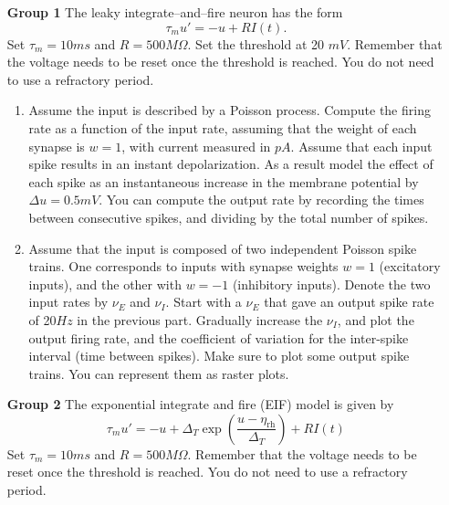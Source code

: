 \documentclass[12pt]{article}
\begin{document}
\begin{enumerate}
\item[\bf Group 1]  The leaky integrate--and--fire neuron has the form
$$
\tau_m u' = - u + R I(t).
$$
Set $\tau_m = 10 ms$ and $R = 500M \Omega$.  Set the threshold at 20 $mV$. Remember that the voltage needs to be reset once the threshold is reached.  You do not need to use a refractory period.   

\begin{enumerate}
\item Assume the input is described by a Poisson process. Compute the firing rate as a function of the input rate, assuming that the weight of each synapse is $w = 1$,
with current measured in $pA$.  Assume that each input spike results in an instant depolarization.  As a result model the effect of each spike as  an instantaneous increase in the membrane potential
by $\Delta u = 0.5mV$.  You can compute the output rate by recording the times between consecutive spikes, and dividing by the total
number of spikes.
\item Assume that the input is composed of two independent Poisson spike trains.  One corresponds to inputs with synapse weights $w = 1$ (excitatory inputs), and the other with $w = -1$ (inhibitory inputs).  Denote the two input rates by $\nu_E$ and $\nu_I$. Start with a $\nu_E$ that gave an output spike rate of 20$Hz$ in the previous part. Gradually increase the $\nu_I$, and plot the output firing rate, and the coefficient of variation for the inter-spike interval (time between spikes).  Make sure to plot some output spike trains. You can represent them as raster plots.
\end{enumerate}

\item[\bf Group 2] 
The exponential integrate and fire (EIF) model is given by 
\begin{equation} \label{E:EIF}
\tau_m u' = - u + \Delta_T \exp \left( \frac{u - \eta_{\text{rh}}}{\Delta_T} \right) + R I(t) 
\end{equation}
Set $\tau_m = 10 ms$ and $R = 500M \Omega$. Remember that the voltage needs to be reset once the threshold is reached.  You do not need to use a refractory period.   


\end{enumerate}
\end{document}
